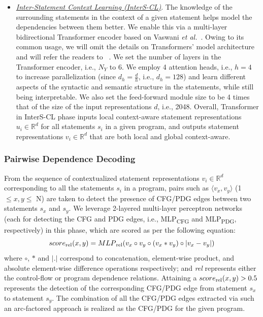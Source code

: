 \begin{itemize}[leftmargin=*, listparindent=\parindent, parsep=0pt, itemsep=\topsep]
    \item \underline{\textit{Inter-Statement Context Learning (InterS-CL)}}. The knowledge of the surrounding statements in the context of a given statement helps \tool model the dependencies between them better. We enable this via a multi-layer bidirectional Transformer encoder based on Vaswani {\em et al.}~\cite{Vaswani-2017}. Owing to its common usage, we will omit the details on Transformers' model architecture and will refer the readers to ~\cite{Vaswani-2017}. We set the number of layers in the Transformer encoder, i.e., $N_Y$ to 6. We employ 4 attention heads, i.e., $h$$=$$4$ to increase parallelization (since $d_h$$=$$\frac{d}{h}$, i.e., $d_h$$=$$128$) and learn different aspects of the syntactic and semantic structure in the statements, while still being interpretable. We also set the feed-forward module size to be 4 times that of the size of the input representations $d$, i.e., 2048. Overall, Transformer in InterS-CL phase inputs local context-aware statement representations $u_i \in \mathbb{R}^d$ for all statements $s_i$ in a given program, and outputs statement representations $v_i \in \mathbb{R}^d$ that are both local and global context-aware.
\end{itemize}

\subsubsection{Pairwise Dependence Decoding}
From the sequence of contextualized statement representations $v_i \in\mathbb{R}^d$ corresponding to all the statements $s_i$ in a program, pairs such as $\langle v_x, v_y \rangle$ (1$\leq x, y\leq$ N) are taken to detect the presence of CFG/PDG edges between two statements $s_x$ and $s_y$. We leverage 2-layered multi-layer perceptron networks (each for detecting the CFG and PDG edges, i.e., MLP\textsubscript{CFG} and MLP\textsubscript{PDG}, respectively) in this phase, which are scored as per the following equation:
\begin{equation}
\centering
    score\textsubscript{rel}(x, y) = MLP\textsubscript{rel}(v_x \circ v_y \circ (v_x * v_y) \circ |v_x - v_y|) \nonumber
\end{equation}
where $\circ$, $*$ and $|.|$ correspond to concatenation, element-wise
product, and absolute element-wise difference operations respectively;
and \textit{rel} represents either the control-flow or program
dependence relations. 
Attaining a $score\textsubscript{rel}(x, y) >
0.5$ represents the detection of the corresponding CFG/PDG edge from
statement $s_x$ to statement $s_y$. The combination of all the CFG/PDG
edges extracted via such an arc-factored approach is realized as the
CFG/PDG for the given program.

